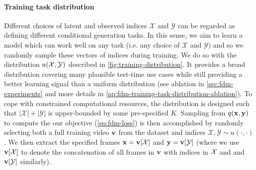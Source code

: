 \paragraph{Training task distribution}
Different choices of latent and observed indices $\mathcal{X}$ and $\mathcal{Y}$ can be regarded as defining different conditional generation tasks. In this sense, we aim to learn a model which can work well on any task (i.e. any choice of $\mathcal{X}$ and $\mathcal{Y}$) and so we randomly sample these vectors of indices during training. We do so with the distribution $u(\mathcal{X},\mathcal{Y})$ described in \cref{fig:training-distribution}. It provides a broad distribution covering many plausible test-time use cases while still providing a better learning signal than a uniform distribution (see ablation in \cref{sec:fdm-experiments} and more details in \cref{ap:fdm-training-task-distribution-ablation}). To cope with constrained computational resources, the distribution is designed such that $|\mathcal{X}|+|\mathcal{Y}|$ is upper-bounded by some pre-specified $K$. Sampling from $q({\mathbf{x}}, {\mathbf{y}})$ to compute the our objective (\cref{eq:fdm-loss}) is then accomplished by randomly selecting both a full training video ${\mathbf{v}}$ from the dataset and indices $\mathcal{X},\mathcal{Y}\sim u(\cdot,\cdot)$. We then extract the specified frames ${\mathbf{x}} = {\mathbf{v}}[\mathcal{X}]$ and ${\mathbf{y}} = {\mathbf{v}}[\mathcal{Y}]$ (where we use ${\mathbf{v}}[\mathcal{X}]$ to denote the concatenation of all frames in ${\mathbf{v}}$ with indices in $\mathcal{X}$ and and ${\mathbf{v}}[\mathcal{Y}]$ similarly).


